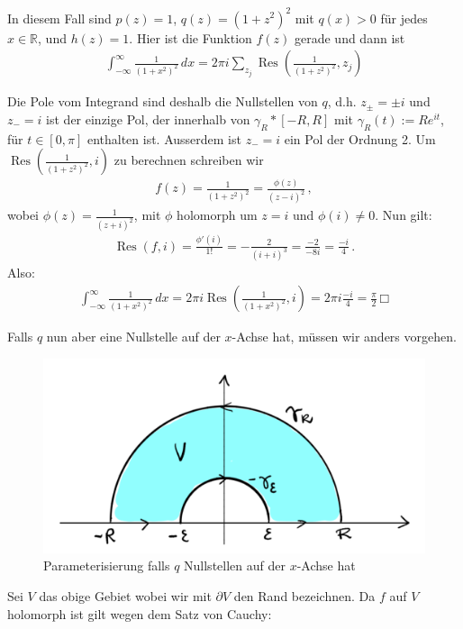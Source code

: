 \documentclass[a4paper,10pt]{article}
\begin{document}
In diesem Fall sind \(p(z)=1\), \(q(z) = (1+z^2)^2\) mit \(q(x) > 0\) für jedes \(x\in\mathbb{R}\), und \(h(z)=1\). Hier ist die Funktion \(f(z)\) gerade und dann ist \begin{align*} \int_{-\infty}^\infty \frac{1}{(1+x^2)^2}\,dx =2 \pi i \sum_{z_j}\operatorname{Res} \left(\frac{1}{(1+z^2)^2},z_j \right) \end{align*}

Die Pole vom Integrand sind deshalb die Nullstellen von \(q\), d.h. \(z_{\pm}= \pm i\) und \(z_-= i\) ist der einzige Pol, der innerhalb von \(\gamma_R\ast[-R,R]\) mit \(\gamma_R(t):=Re^{ i t}\), für \(t\in[0,\pi]\) enthalten ist. Ausserdem ist \(z_-= i\) ein Pol der Ordnung 2. Um \(\operatorname{Res} \left(\frac{1}{(1+z^2)^2}, i \right)\) zu berechnen schreiben wir \begin{align*} f(z)=\frac{1}{(1+z^2)^2}=\frac{\phi(z)}{(z- i)^2}\,, \end{align*} wobei \(\phi(z)=\frac{1}{(z+ i)^2}\), mit \(\phi\) holomorph um \(z= i\) und \(\phi( i)\neq0\). Nun gilt: \begin{align*} \operatorname{Res}(f, i) = \frac{\phi'( i)}{1!} = -\frac{2}{( i + i)^3} = \frac{-2}{-8 i} = \frac{- i}{4}\,. \end{align*} Also: \begin{align*} \int_{-\infty}^\infty \frac{1}{(1+x^2)^2}\,dx =2\pi i\operatorname{Res} \left(\frac{1}{(1+x^2)^2}, i \right)= 2\pi i\frac{- i}{4}=\frac{\pi}{2}\,□ \end{align*}

Falls $q$ nun aber eine Nullstelle auf der $x$-Achse hat, müssen wir anders vorgehen.

\begin{figure}[H]
  \centering 
  \includegraphics[width=0.75\linewidth]{assets/4-4-2.png}
  \caption{Parameterisierung falls $q$ Nullstellen auf der $x$-Achse hat}
\end{figure}

Sei $V$ das obige Gebiet wobei wir mit $\partial V$ den Rand bezeichnen. Da $f$ auf $V$ holomorph ist gilt wegen dem Satz von Cauchy:
\end{document}
